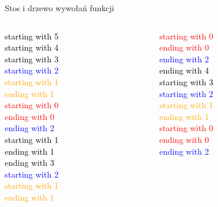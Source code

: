 \begin{frame}{Stos i drzewo wywołań funkcji}
    \centering
    \begin{columns}
        \begin{column}{0.25\textwidth}
            \textcolor{black}{starting with 5}\\
            \textcolor{black}{starting with 4}\\
            \textcolor{black}{starting with 3}\\
            \textcolor{blue}{starting with 2}\\
            \textcolor{orange}{starting with 1}\\
            \textcolor{orange}{ending with 1}\\
            \textcolor{red}{starting with 0}\\
            \textcolor{red}{ending with 0}\\
            \textcolor{blue}{ending with 2}\\
            \textcolor{black}{starting with 1}\\
            \textcolor{black}{ending with 1}\\
            \textcolor{black}{ending with 3}\\
            \textcolor{blue}{starting with 2}\\
            \textcolor{orange}{starting with 1}\\
            \textcolor{orange}{ending with 1}\\
        \end{column}
        \begin{column}{0.25\textwidth}
            \textcolor{red}{starting with 0}\\
            \textcolor{red}{ending with 0}\\
            \textcolor{blue}{ending with 2}\\
            \textcolor{black}{ending with 4}\\
            \textcolor{black}{starting with 3}\\
            \textcolor{blue}{starting with 2}\\
            \textcolor{orange}{starting with 1}\\
            \textcolor{orange}{ending with 1}\\
            \textcolor{red}{starting with 0}\\
            \textcolor{red}{ending with 0}\\
            \textcolor{blue}{ending with 2}\\

\end{column}
\end{columns}
\end{frame}
